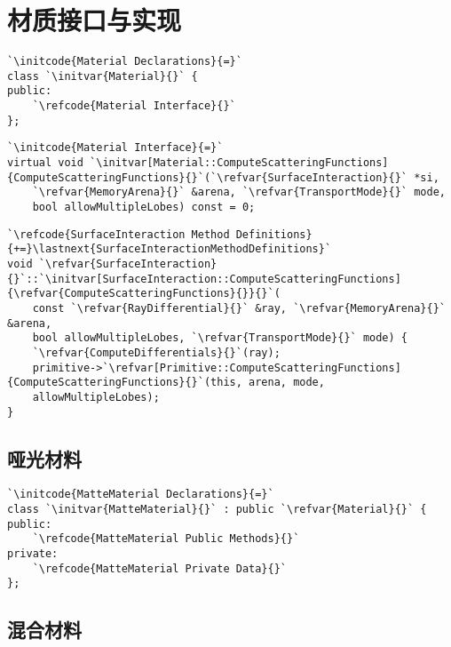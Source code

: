 \section{材质接口与实现}\label{sec:材质接口与实现}

\begin{lstlisting}
`\initcode{Material Declarations}{=}`
class `\initvar{Material}{}` {
public:
    `\refcode{Material Interface}{}`
};
\end{lstlisting}

\begin{lstlisting}
`\initcode{Material Interface}{=}`
virtual void `\initvar[Material::ComputeScatteringFunctions]{ComputeScatteringFunctions}{}`(`\refvar{SurfaceInteraction}{}` *si,
    `\refvar{MemoryArena}{}` &arena, `\refvar{TransportMode}{}` mode,
    bool allowMultipleLobes) const = 0;
\end{lstlisting}

\begin{lstlisting}
`\refcode{SurfaceInteraction Method Definitions}{+=}\lastnext{SurfaceInteractionMethodDefinitions}`
void `\refvar{SurfaceInteraction}{}`::`\initvar[SurfaceInteraction::ComputeScatteringFunctions]{\refvar{ComputeScatteringFunctions}{}}{}`(
    const `\refvar{RayDifferential}{}` &ray, `\refvar{MemoryArena}{}` &arena,
    bool allowMultipleLobes, `\refvar{TransportMode}{}` mode) {
    `\refvar{ComputeDifferentials}{}`(ray);
    primitive->`\refvar[Primitive::ComputeScatteringFunctions]{ComputeScatteringFunctions}{}`(this, arena, mode,
    allowMultipleLobes);
}
\end{lstlisting}

\subsection{哑光材料}\label{sub:哑光材料}
\begin{lstlisting}
`\initcode{MatteMaterial Declarations}{=}`
class `\initvar{MatteMaterial}{}` : public `\refvar{Material}{}` {
public:
    `\refcode{MatteMaterial Public Methods}{}`
private:
    `\refcode{MatteMaterial Private Data}{}`
};
\end{lstlisting}

\subsection{混合材料}\label{sub:混合材料}